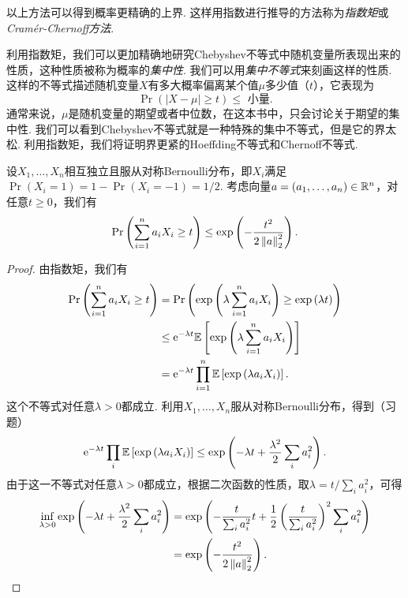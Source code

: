 以上方法可以得到概率更精确的上界. 这样用指数进行推导的方法称为\emph{指数矩}或\emph{Cramér-Chernoff方法}. 

利用指数矩，我们可以更加精确地研究Chebyshev不等式中随机变量所表现出来的性质，这种性质被称为概率的\emph{集中性}. 我们可以用\emph{集中不等式}来刻画这样的性质. 这样的不等式描述随机变量$X$有多大概率偏离某个值$\mu$多少值（$t$），它表现为
\[
\Pr(| X - \mu| \geq t) \leq \text{ 小量}.
\]
通常来说，$\mu$是随机变量的期望或者中位数，在这本书中，只会讨论关于期望的集中性. 我们可以看到Chebyshev不等式就是一种特殊的集中不等式，但是它的界太松. 利用指数矩，我们将证明界更紧的Hoeffding不等式和Chernoff不等式. 

\begin{theorem}\label{thm:hoeffding-inequality}
    设$X_1, \dots, X_n$相互独立且服从对称Bernoulli分布，即$X_i$满足$\Pr(X_i=1)=1-\Pr(X_i=-1)=1/2$. 考虑向量$a = (a_1, \dots, a_n) \in \mathbb{R}^n$，对任意$t\geq0$，我们有
    \[
        \Pr\left(\sum_{i=1}^n a_i X_i \geq t\right)\leq \exp \left( - \frac{t^2}{2\left\|a\right\|^2_2}\right).
    \]
\end{theorem}
\begin{proof}
由指数矩，我们有
\[
\begin{aligned}
    \Pr\left(\sum_{i=1}^n a_i X_i \geq t\right) &= \Pr\left(\exp\left(\lambda \sum_{i=1}^n a_i X_i\right) \geq \exp\left(\lambda t\right)\right) \\
    &\leq \mathrm{e}^{-\lambda t} \mathbb{E} \left[\exp\left(\lambda \sum_{i=1}^n a_i X_i\right)\right]\\
    &=  \mathrm{e}^{-\lambda t}\prod_{i=1}^n \mathbb{E}\left[\exp\left(\lambda a_i X_i\right)\right].
\end{aligned}
\]
这个不等式对任意$\lambda > 0$都成立. 
利用$X_1, \dots, X_n$服从对称Bernoulli分布，得到（习题）
\begin{equation}
\mathrm{e}^{-\lambda t}\prod_{i} \mathbb{E}\left[\exp\left(\lambda a_i X_i\right)\right]\leq\exp \left(-\lambda t + \frac{\lambda^2}{2} \sum_{i} a_i^2\right).\label{eq:exponential-moment}
\end{equation}
由于这一不等式对任意$\lambda > 0$都成立，根据二次函数的性质，取$\lambda = t / \sum_i a_i^2$，可得
\[
\begin{aligned}
    \inf_{\lambda>0}\exp \left(-\lambda t + \frac{\lambda^2}{2} \sum_{i} a_i^2\right) &=\exp\left( -\frac{t}{\sum_i a_i^2} t + \frac12 \left(\frac{t}{\sum_i a_i^2}\right)^2 \sum_{i} a_i^2\right) \\
    &= \exp \left( - \frac{t^2}{2\left\|a\right\|_2^2}\right).
\end{aligned}
\]
\end{proof}

